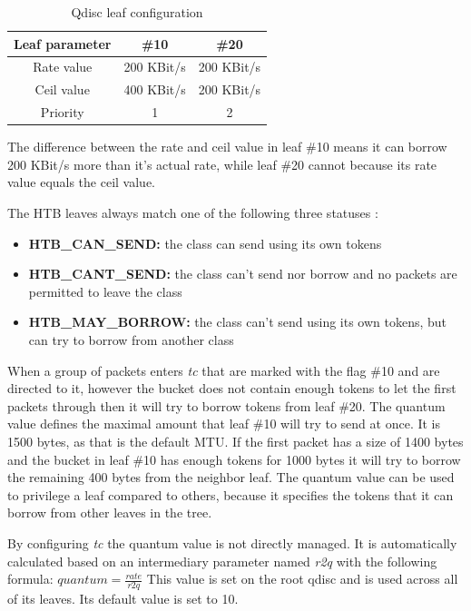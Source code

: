 \begin{table}[H]
\centering

\begin{tabular}{|c|c|c|}
\hline Leaf parameter & \#10 & \#20 \\ 
\hline Rate value & 200 KBit/s & 200 KBit/s \\ 
\hline Ceil value & 400 KBit/s & 200 KBit/s \\ 
\hline Priority & 1 & 2 \\ 
\hline 
\end{tabular} 

\caption{Qdisc leaf configuration}
\end{table}

The difference between the rate and ceil value in leaf \#10 means it can borrow 200 KBit/s more than it's actual rate, while leaf \#20 cannot because its rate value equals the ceil value.

The HTB leaves always match one of the following three statuses \cite{htb-qdiscs}:
\begin{itemize}
\item \textbf{HTB\_CAN\_SEND:} the class can send using its own tokens
\item \textbf{HTB\_CANT\_SEND:} the class can't send nor borrow and no packets are permitted to leave the class
\item \textbf{HTB\_MAY\_BORROW:} the class can't send using its own tokens, but can try to borrow from another class
\end{itemize}

When a group of packets enters \textit{tc} that are marked with the flag \#10 and are directed to it, however the bucket does not contain enough tokens to let the first packets through then it will try to borrow tokens from leaf \#20. The quantum value defines the maximal amount that leaf \#10 will try to send at once. It is 1500 bytes, as that is the default MTU. If the first packet has a size of 1400 bytes and the bucket in leaf \#10 has enough tokens for 1000 bytes it will try to borrow the remaining 400 bytes from the neighbor leaf. The quantum value can be used to privilege a leaf compared to others, because it specifies the tokens that it can borrow from other leaves in the tree.

By configuring \textit{tc} the quantum value is not directly managed. It is automatically calculated based on an intermediary parameter named \textit{r2q} with the following formula:  $ quantum = \frac{rate}{r2q} $ This value is set on the root qdisc and is used across all of its leaves. Its default value is set to 10.


